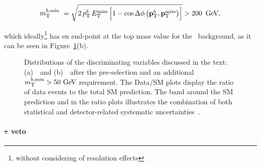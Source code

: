				\begin{equation*}
					\mtbmin\ = \sqrt{2\,\ptb\,\met \left[1-\cos{\Delta\phi\left(\vecptb,\ptmiss\right)}\right]} > 200\,\GeV,
				\end{equation*}

				\noindent which ideally\footnote{without considering of resolution effects} has en end-point at the top mass value for the \ttbar\ background, as it can be seen in Figure~\ref{fig:preselection}(b).
				\begin{figure}[!htb]
				  \begin{center}
					  \caption{Distributions of the discriminating variables discussed in the text: (a)~\mantikttwelvezero\ and (b)~\mtbmin\ after the pre-selection and an additional $\mtbmin>50\gev$ requirement. The Data/\ac{SM} plots display the ratio of data events to the total \ac{SM} prediction. The band around the \ac{SM} prediction and in the ratio plots illustrates the combination of both statistical and detector-related systematic uncertainties~\cite{stop0L}.}
					  \label{fig:preselection}
				  \end{center}
				\end{figure}

			\paragraph{$\mathbf{\tau}$ veto}

